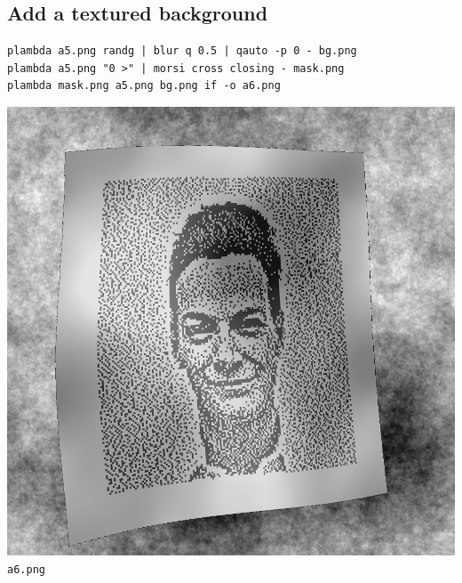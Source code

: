 \subsection{Add a textured background}
\begin{verbatim}
plambda a5.png randg | blur q 0.5 | qauto -p 0 - bg.png
plambda a5.png "0 >" | morsi cross closing - mask.png
plambda mask.png a5.png bg.png if -o a6.png
\end{verbatim}
\includegraphics{a6.png}\verb+a6.png+

